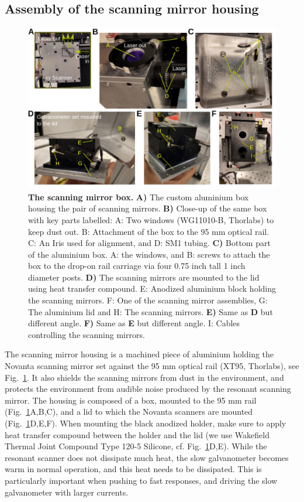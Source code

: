 \documentclass[10pt,letterpaper]{article}
\begin{document}
\subsection{Assembly of the scanning mirror housing}
%
\begin{figure}[!t]
    \includegraphics[width=\textwidth]{sfig10.jpg}
    \caption{{\bf The scanning mirror box.} \textbf{A)} The custom aluminium box housing the pair of scanning mirrors. \textbf{B)} Close-up of the same box with key parts labelled: A: Two windows (WG11010-B, Thorlabs) to keep dust out. B: Attachment of the box to the 95 mm optical rail. C: An Iris used for alignment, and D: SM1 tubing. \textbf{C)} Bottom part of the aluminium box. A: the windows, and B: screws to attach the box to the drop-on rail carriage via four 0.75 inch tall 1 inch diameter posts. \textbf{D)} The scanning mirrors are mounted to the lid using heat transfer compound. E: Anodized aluminium block holding the scanning mirrors. F: One of the scanning mirror assemblies, G: The aluminium lid and H: The scanning mirrors. \textbf{E)} Same as \textbf{D} but different angle. \textbf{F)} Same as \textbf{E} but different angle. I: Cables controlling the scanning mirrors.}
    \label{sfig10}
\end{figure}
%
The scanning mirror housing is a machined piece of aluminium holding the Novanta scanning mirror set against the 95 mm optical rail (XT95, Thorlabs), see Fig.~\ref{sfig10}. It also shields the scanning mirrors from dust in the environment, and protects the environment from audible noise produced by the resonant scanning mirror. The housing is composed of a box, mounted to the 95 mm rail (Fig.~\ref{sfig10}A,B,C), and a lid to which the Novanta scanners are mounted (Fig.~\ref{sfig10}D,E,F). When mounting the black anodized holder, make sure to apply heat transfer compound between the holder and the lid (we use Wakefield Thermal Joint Compound Type 120-5 Silicone, cf. Fig.~\ref{sfig10}D,E). While the resonant scanner does not dissipate much heat, the slow galvanometer becomes warm in normal operation, and this heat needs to be dissipated. This is particularly important when pushing to fast responses, and driving the slow galvanometer with larger currents.\newline
\end{document}

